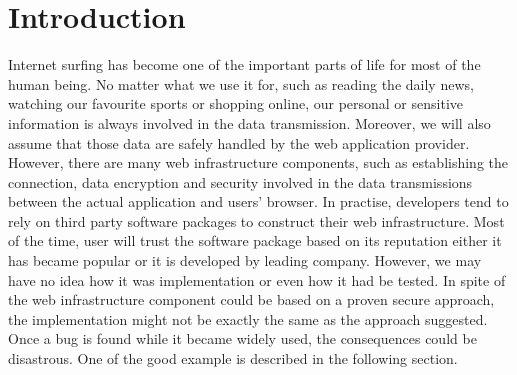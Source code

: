 
\chapter{Introduction}






Internet surfing has become one of the important parts of life for most of the human being. No matter what we use it for, such as reading the daily news, watching our favourite sports or shopping online, our personal or sensitive information is always involved in the data transmission. Moreover, we will also assume that those data are safely handled by the web application provider. However, there are many web infrastructure components, such as establishing the connection, data encryption and security involved in the data transmissions between the actual application and users' browser. In practise, developers tend to rely on third party software packages to construct their web infrastructure. Most of the time, user will trust the software package based on its reputation either it has became popular or it is developed by leading company. However, we may have no idea how it was implementation or even how it had be tested. In spite of the web infrastructure component could be based on a proven secure approach, the implementation might not be exactly the same as the approach suggested. Once a bug is found while it became widely used, the consequences could be disastrous. One of the good example is described in the following section.

